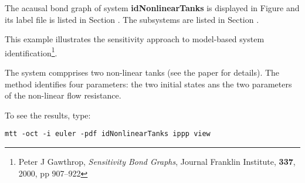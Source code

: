 

   The acausal bond graph of system \textbf{idNonlinearTanks} is
   displayed in Figure  and its label
   file is listed in Section .
   The subsystems are listed in Section .

   
   This example illustrates the sensitivity approach to model-based
   system identification\footnote{Peter J Gawthrop, \emph{Sensitivity
       Bond Graphs}, Journal Franklin Institute, \textbf{337}, 2000,
     pp 907--922}.

   The system compprises two non-linear tanks (see the paper for details).
   The method identifies four parameters: the two initial states ans
   the two parameters of the non-linear flow resistance.

   To see the results, type: 
\begin{verbatim}
mtt -oct -i euler -pdf idNonlinearTanks ippp view
\end{verbatim}

